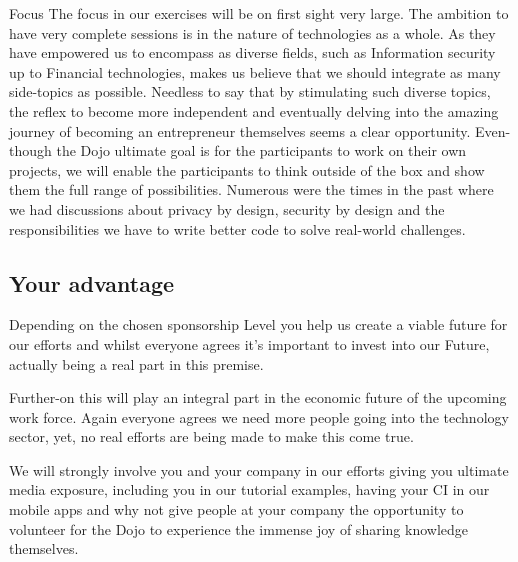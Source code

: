 \documentclass{proposal}
\makeatletter
\renewcommand{\paragraph}{
  \@startsection{paragraph}{4}
    {\z@}{1.25ex \@plus 1ex \@minus .2ex}{-1em}
      {\normalfont\normalsize\bfseries}
      }
\makeatother
\begin{document}
\paragraph{Focus}
The focus in our exercises will be on first sight very large. The ambition to have very complete sessions is in the nature of technologies as a whole. As they have empowered us to encompass as diverse fields, such as Information security up to Financial technologies, makes us believe that we should integrate as many side-topics as possible.
Needless to say that by stimulating such diverse topics, the reflex to become more independent and eventually delving into the amazing journey of becoming an entrepreneur themselves seems a clear opportunity.
Even-though the Dojo ultimate goal is for the participants to work on their own projects, we will enable the participants to think outside of the box and show them the full range of possibilities.
Numerous were the times in the past where we had discussions about privacy by design, security by design and the responsibilities we have to write better code to solve real-world challenges.


\newpage

\subsection*{Your advantage}
Depending on the chosen sponsorship Level you help us create a viable future for our efforts and whilst everyone agrees it's important to invest into our Future, actually being a real part in this premise.

Further-on this will play an integral part in the economic future of the upcoming work force. Again everyone agrees we need more people going into the technology sector, yet, no real efforts are being made to make this come true.

We will strongly involve you and your company in our efforts giving you ultimate media exposure, including you in our tutorial examples, having your CI in our mobile apps and why not give people at your company the opportunity to volunteer for the Dojo to experience the immense joy of sharing knowledge themselves.
\end{document}
